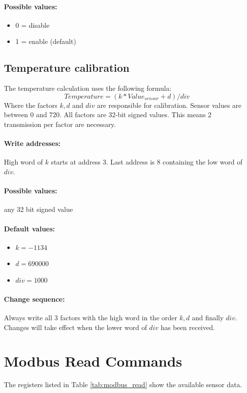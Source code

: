 \paragraph{Possible values:}
\begin{itemize}
    \item 0 = disable
    \item 1 = enable (default)
\end{itemize}

\subsection{Temperature calibration}
The temperature calculation uses the following formula:
\[
Temperature = (k * Value_{sensor} + d) / div
\]
Where the factors $k, d$ and $div$ are responsible for calibration. Sensor values are between 0 and 720. All factors are 32-bit signed values. This means 2 transmission per factor are necessary.

\paragraph{Write addresses:} High word of $k$ starts at address 3. Last address is 8 containing the low word of $div$.

\paragraph{Possible values:} any 32 bit signed value

\paragraph{Default values:}
\begin{itemize}
\item $k = -1134  $
\item $d = 690000 $
\item $div = 1000 $
\end{itemize}

\paragraph{Change sequence:} Always write all 3 factors with the high word in the order $k, d$ and finally $div$. Changes will take effect when the lower word of $div$ has been received.

\section{Modbus Read Commands}
The registers listed in Table \ref{tab:modbus_read} show the available sensor data.

